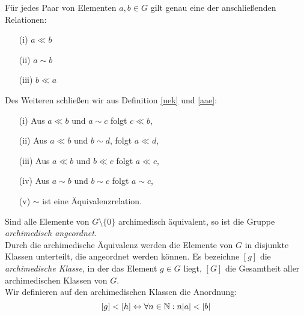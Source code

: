 \begin{folg}
Für jedes Paar von Elementen $a, b \in G$ gilt genau eine der anschließenden Relationen: 
\begin{multicols}{3}
\begin{enumerate}
\item[(i)] $a \ll b$
\item[(ii)] $a \sim b$
\item[(iii)] $b \ll a$ 
\end{enumerate}
\end{multicols}
%
Des Weiteren schließen wir aus Definition \ref{uek} und \ref{aae}:
\begin{enumerate}
\item[(i)] Aus $a \ll b$ und $a \sim c$ folgt $c \ll b$,
\item[(ii)] Aus $a \ll b$ und $b \sim d$, folgt $a \ll d$,
\item[(iii)] Aus $a \ll b$ und $b \ll c$ folgt $a \ll c$,
\item[(iv)] Aus $a \sim b$ und $b \sim c$ folgt $a \sim c$,
\item[(v)] $\sim$ ist eine Äquivalenzrelation.
\end{enumerate}
Sind alle Elemente von $G\setminus\lbrace 0 \rbrace$ archimedisch äquivalent, so ist die Gruppe \textit{archimedisch angeordnet}. \\ 
Durch die archimedische Äquivalenz werden die Elemente von $G$ in disjunkte Klassen unterteilt, die angeordnet werden können. Es bezeichne $[g]$ die \textit{archimedische Klasse}, in der das Element $g \in G$ liegt, $[G]$ die Gesamtheit aller archimedischen Klassen von $G$. \\
Wir definieren auf den archimedischen Klassen die Anordnung: 
\[\lbrack g\rbrack < \lbrack h\rbrack \Leftrightarrow \forall n\in \mathbb{N}: n|a| < |b| \]\label{archimedischeKlassen}
\end{folg}


